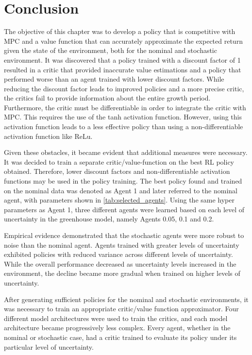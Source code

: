 \section{Conclusion}
The objective of this chapter was to develop a policy that is competitive with MPC and a value function that can accurately approximate the expected return given the state of the environment, both for the nominal and stochastic environment.
It was discovered that a policy trained with a discount factor of 1 resulted in a critic that provided inaccurate value estimations and a policy that performed worse than an agent trained with lower discount factors. While reducing the discount factor leads to improved policies and a more precise critic, the critics fail to provide information about the entire growth period. Furthermore, the critic must be differentiable in order to integrate the critic with MPC. This requires the use of the tanh activation function. However, using this activation function leads to a less effective policy than using a non-differentiable activation function like ReLu.

Given these obstacles, it became evident that additional measures were necessary. It was decided to train a separate critic/value-function on the best RL policy obtained. Therefore, lower discount factors and non-differentiable activation functions may be used in the policy training. The best policy found and trained on the nominal data was denoted as Agent 1 and later referred to the nominal agent, with parameters shown in \autoref{tab:selected_agents}. Using the same hyper parameters as Agent 1, three different agents were learned based on each level of uncertainty in the greenhouse model, namely Agents 0.05, 0.1 and 0.2. 

Empirical evidence demonstrated that the stochastic agents were more robust to noise than the nominal agent. Agents trained with greater levels of uncertainty exhibited policies with reduced variance across different levels of uncertainty. While the overall performance decreased as uncertainty levels increased in the environment, the decline became more gradual when trained on higher levels of uncertainty.

 After generating sufficient policies for the nominal and stochastic environments, it was necessary to train an appropriate critic/value function approximator. Four different model architectures were used to train the critics, and each model architecture became progressively less complex. Every agent, whether in the nominal or stochastic case, had a critic trained to evaluate its policy under its particular level of uncertainty. 
 
